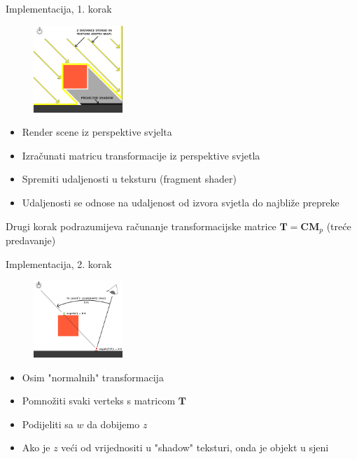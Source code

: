 \documentclass[9pt]{beamer}
\begin{document}
\begin{frame}{Implementacija, 1. korak}
	\begin{figure}
		\centering
		\includegraphics[width=0.3\textwidth]{slike/shadow_mapping_theory_spaces_left.png}
	\end{figure}
	\begin{itemize}
		\item Render scene iz perspektive svjelta
		\item Izračunati matricu transformacije iz perspektive svjetla
		\item Spremiti udaljenosti u teksturu (fragment shader)
		\item Udaljenosti se odnose na udaljenost od izvora svjetla do najbliže prepreke
	\end{itemize}
Drugi korak podrazumijeva računanje transformacijske matrice $\mathbf{T} = \mathbf{C}\mathbf{M}_p$ (treće predavanje)
\end{frame}	
\begin{frame}{Implementacija, 2. korak}
	\begin{figure}
		\centering
		\includegraphics[width=0.3\textwidth]{slike/shadow_mapping_theory_spaces_right.png}
	\end{figure}
	\begin{itemize}
		\item Osim "normalnih" transformacija
		\item Pomnožiti svaki verteks s matricom $\mathbf{T}$ 
		\item Podijeliti sa $w$ da dobijemo $z$
		\item Ako je $z$ veći od vrijednositi u "shadow" teksturi, onda je objekt u sjeni
	\end{itemize}
\end{frame}	
\end{document}
